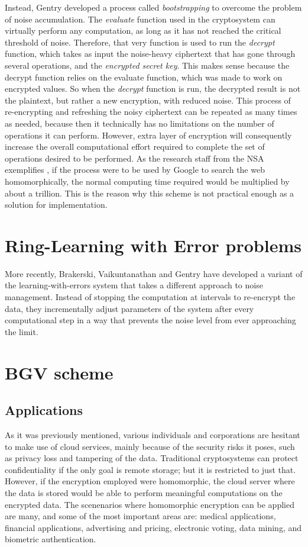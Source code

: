 Instead, Gentry developed a process called \emph{bootstrapping} to overcome the problem of noise accumulation. The \emph{evaluate} function used in the cryptosystem can virtually perform any computation, as long as it has not reached the critical threshold of noise. Therefore, that very function is used to run the \emph{decrypt} function, which takes as input the noise-heavy ciphertext that has gone through several operations, and the \emph{encrypted secret key}. This makes sense because the decrypt function relies on the evaluate function, which was made to work on encrypted values. So when the \emph{decrypt} function is run, the decrypted result is not the plaintext, but rather a new encryption, with reduced noise. This process of re-encrypting and refreshing the noisy ciphertext can be repeated as many times as needed, because then it technically has no limitations on the number of operations it can perform. However, extra layer of encryption will consequently increase the overall computational effort required to complete the set of operations desired to be performed. As the research staff from the NSA exemplifies \cite{NSA2014}, if the process were to be used by Google to search the web homomorphically, the normal computing time required would be multiplied by about a trillion. This is the reason why this scheme is not practical enough as a solution for implementation.

\section{Ring-Learning with Error problems}


\cite{Hayes2012} More recently, Brakerski, Vaikuntanathan and Gentry have developed a variant of the learning-with-errors system that takes a different approach to noise management. Instead of stopping the computation at intervals to re-encrypt the data, they incrementally adjust parameters of the system after every computational step in a way that prevents the noise level from ever approaching the limit.

\section{BGV scheme}


\subsection{Applications}

As it was previously mentioned, various individuals and corporations are hesitant to make use of cloud services, mainly because of the security risks it poses, such as privacy loss and tampering of the data. Traditional cryptosystems can protect confidentiality if the only goal is remote storage; but it is restricted to just that. However, if the encryption employed were homomorphic, the cloud server where the data is stored would be able to perform meaningful computations on the encrypted data.  The scenenarios where homomorphic encryption can be applied are many, and some of the most important areas are: medical applications, financial applications, advertising and pricing, electronic voting, data mining, and biometric authentication.

